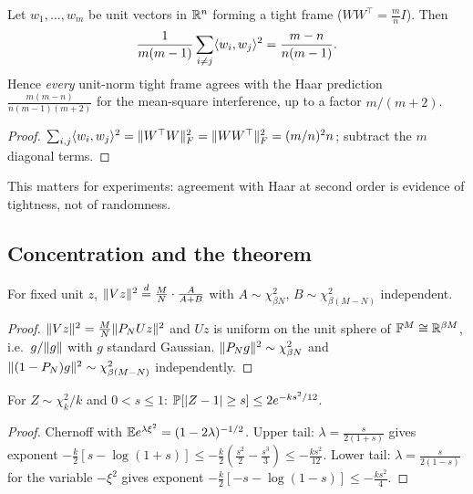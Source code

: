 \begin{proposition}\label{prop:frame-identity}\proved
Let $w_1,\dots,w_m$ be unit vectors in $\mathbb R^n$ forming a tight frame ($WW^\top=\frac mn I$). Then
\[
\frac{1}{m(m-1)}\sum_{i\ne j}\langle w_i,w_j\rangle^2=\frac{m-n}{n(m-1)} .
\]
Hence \emph{every} unit-norm tight frame agrees with the Haar prediction $\frac{m(m-n)}{n(m-1)(m+2)}$ for the
mean-square interference, up to a factor $m/(m+2)$.
\end{proposition}
\begin{proof}
$\sum_{i,j}\langle w_i,w_j\rangle^2=\lVert W^\top W\rVert_F^2=\lVert WW^\top\rVert_F^2=(m/n)^2n$; subtract the $m$ diagonal terms.
\end{proof}
This matters for experiments: agreement with Haar at second order is evidence of tightness, not of randomness.

\subsection{Concentration and the theorem}
\begin{lemma}\label{lem:beta}\proved
For fixed unit $z$, $\lVert Vz\rVert^2\overset{d}{=}\frac MN\cdot\frac{A}{A+B}$ with $A\sim\chi^2_{\beta N}$,
$B\sim\chi^2_{\beta(M-N)}$ independent.
\end{lemma}
\begin{proof}
$\lVert Vz\rVert^2=\frac MN\lVert P_NUz\rVert^2$ and $Uz$ is uniform on the unit sphere of $\mathbb F^M\cong\mathbb R^{\beta M}$, i.e.\ $g/\lVert g\rVert$ with $g$ standard Gaussian. $\lVert P_Ng\rVert^2\sim\chi^2_{\beta N}$ and $\lVert (1-P_N)g\rVert^2\sim\chi^2_{\beta(M-N)}$
independently.
\end{proof}

\begin{lemma}\label{lem:chisq}\proved
For $Z\sim\chi^2_k/k$ and $0<s\le1$: $\mathbb P[\lvert Z-1\rvert\ge s]\le2e^{-ks^2/12}$.
\end{lemma}
\begin{proof}
Chernoff with $\mathbb E e^{\lambda\xi^2}=(1-2\lambda)^{-1/2}$. Upper tail: $\lambda=\frac{s}{2(1+s)}$ gives exponent
$-\frac k2[s-\log(1+s)]\le-\frac{k}{2}(\frac{s^2}{2}-\frac{s^3}{3})\le-\frac{ks^2}{12}$. Lower tail:
$\lambda=\frac{s}{2(1-s)}$ for the variable $-\xi^2$ gives exponent $-\frac k2[-s-\log(1-s)]\le-\frac{ks^2}{4}$.
\end{proof}


